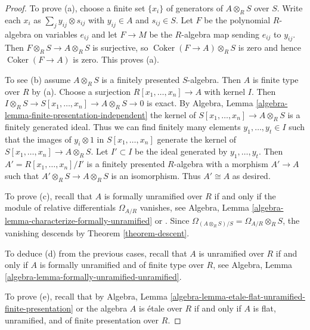 \documentclass{stacks-project}
\theoremstyle{plain}
\theoremstyle{definition}
\theoremstyle{remark}
\numberwithin{equation}{subsection}
\def\Coker{\mathop{\mathrm{Coker}}}
\begin{document}
\begin{proof}
To prove (a), choose a finite set $\{x_i\}$ of generators of $A \otimes_R S$
over $S$. Write each $x_i$ as $\sum_j y_{ij} \otimes s_{ij}$ with
$y_{ij} \in A$ and $s_{ij} \in S$. Let $F$ be the polynomial $R$-algebra
on variables $e_{ij}$ and let $F \to M$ be the $R$-algebra map sending
$e_{ij}$ to $y_{ij}$. Then $F \otimes_R S\to A \otimes_R S$ is surjective, so
$\Coker(F \to A) \otimes_R S$ is zero and hence $\Coker(F \to A)$
is zero. This proves (a).

\medskip\noindent
To see (b) assume $A \otimes_R S$ is a finitely presented $S$-algebra.
Then $A$ is finite type over $R$ by (a). Choose a surjection
$R[x_1, \ldots, x_n] \to A$ with kernel $I$.
Then $I \otimes_R S \to S[x_1, \ldots, x_n] \to A \otimes_R S \to 0$ is exact.
By Algebra, Lemma \ref{algebra-lemma-finite-presentation-independent}
the kernel of $S[x_1, \ldots, x_n] \to A \otimes_R S$
is a finitely generated ideal. Thus we can find finitely many elements
$y_1, \ldots, y_t \in I$ such that the images of $y_i \otimes 1$ in
$S[x_1, \ldots, x_n]$ generate the kernel of
$S[x_1, \ldots, x_n] \to A \otimes_R S$.
Let $I' \subset I$ be the ideal generated by $y_1, \ldots, y_t$.
Then $A' = R[x_1, \ldots, x_n]/I'$ is a finitely presented $R$-algebra
with a morphism $A' \to A$ such that $A' \otimes_R S \to A \otimes_R S$
is an isomorphism. Thus $A' \cong A$ as desired.

\medskip\noindent
To prove (c), recall that $A$ is formally unramified over $R$ if and only
if the module of relative differentials $\Omega_{A/R}$ vanishes, see
Algebra, Lemma \ref{algebra-lemma-characterize-formally-unramified} or
\cite[Proposition~17.2.1]{EGA4}.
Since $\Omega_{(A \otimes_R S)/S} = \Omega_{A/R} \otimes_R S$,
the vanishing descends by Theorem \ref{theorem-descent}.

\medskip\noindent
To deduce (d) from the previous cases, recall that $A$ is unramified
over $R$ if and only if $A$ is formally unramified and of finite type
over $R$, see
Algebra, Lemma \ref{algebra-lemma-formally-unramified-unramified}.

\medskip\noindent
To prove (e), recall that by
Algebra, Lemma \ref{algebra-lemma-etale-flat-unramified-finite-presentation}
or \cite[Th\'eor\`eme~17.6.1]{EGA4} the algebra
$A$ is \'etale over $R$ if and only if
$A$ is flat, unramified, and of finite presentation over $R$.
\end{proof}
\end{document}

